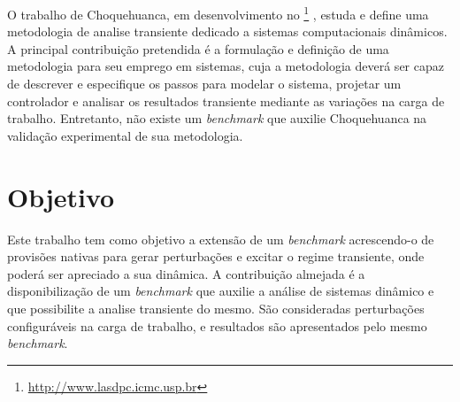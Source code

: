 O trabalho de Choquehuanca, em desenvolvimento no \textit{}\footnote{\url{http://www.lasdpc.icmc.usp.br}} , estuda e define uma metodologia de analise transiente dedicado a sistemas computacionais dinâmicos. A principal contribuição pretendida é a formulação e definição de uma metodologia para seu emprego em sistemas, cuja a metodologia deverá ser capaz de descrever e especifique os passos para modelar o sistema, projetar um controlador e analisar os resultados transiente mediante as variações na carga de trabalho. Entretanto, não existe um \textit{benchmark} que auxilie Choquehuanca na validação experimental de sua metodologia.


\section{Objetivo}
Este trabalho tem como objetivo a extensão de um \textit{benchmark} acrescendo-o de provisões nativas para gerar perturbações e excitar o regime transiente, onde poderá ser apreciado a sua dinâmica.  A contribuição almejada é a disponibilização de um \textit{benchmark} que auxilie a análise de sistemas dinâmico e que possibilite a analise transiente do mesmo. São consideradas perturbações configuráveis na carga de trabalho, e resultados são apresentados pelo mesmo \textit{benchmark}.
